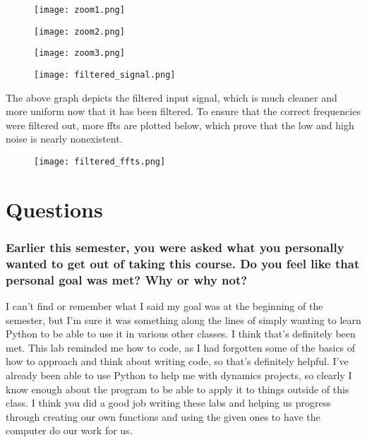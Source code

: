 \documentclass[12pt]{report}
\begin{document}
\begin{figure}[H]
    \centering
    \texttt{[image: zoom1.png]}
\end{figure}

\begin{figure}[H]
    \centering
    \texttt{[image: zoom2.png]}
\end{figure}

\begin{figure}[H]
    \centering
    \texttt{[image: zoom3.png]}
\end{figure}

\begin{figure}[H]
    \centering
    \texttt{[image: filtered\_signal.png]}
\end{figure}

The above graph depicts the filtered input signal, which is much cleaner and more uniform now that it has been filtered. To ensure that the correct frequencies were filtered out, more ffts are plotted below, which prove that the low and high noise is nearly nonexistent.

\begin{figure}[H]
    \centering
    \texttt{[image: filtered\_ffts.png]}
\end{figure}

 
 \section{Questions}
 \subsubsection{Earlier this semester, you were asked what you personally wanted to get out of taking this course. Do you feel like that personal goal was met? Why or why not?}
 
I can't find or remember what I said my goal was at the beginning of the semester, but I'm sure it was something along the lines of simply wanting to learn Python to be able to use it in various other classes. I think that's definitely been met. This lab reminded me how to code, as I had forgotten some of the basics of how to approach and think about writing code, so that's definitely helpful. I've already been able to use Python to help me with dynamics projects, so clearly I know enough about the program to be able to apply it to things outside of this class. I think you did a good job writing these labs and helping us progress through creating our own functions and using the given ones to have the computer do our work for us.
\end{document}
